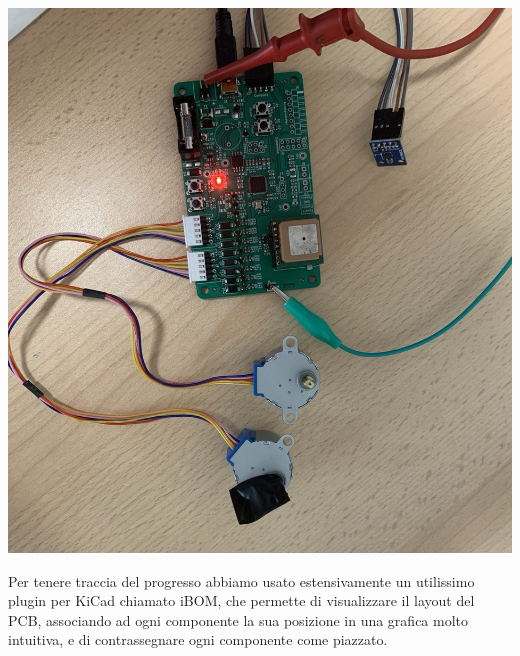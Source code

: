 \begin{center}
\includegraphics[scale=0.4]{figures/image101.png}
\captionsetup{type=figure}
\end{center}

\noindent Per tenere traccia del progresso abbiamo usato estensivamente un 
utilissimo plugin per KiCad chiamato iBOM, che permette di visualizzare il 
layout del PCB, associando ad ogni componente la sua posizione in una grafica molto 
intuitiva, e di contrassegnare ogni componente come piazzato.

